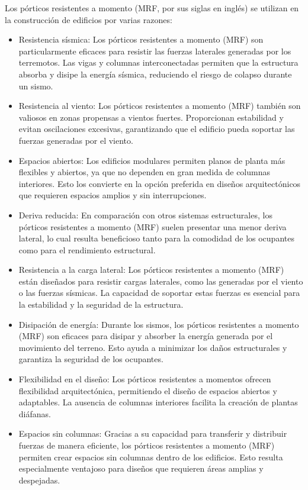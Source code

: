 \documentclass[14pt,letterpaper]{extarticle}
\begin{document}
	Los pórticos resistentes a momento (MRF, por sus siglas en inglés) se utilizan en la construcción de edificios por varias razones:
	\begin{itemize}
		\item Resistencia sísmica: Los pórticos resistentes a momento (MRF) son particularmente eficaces para resistir las fuerzas laterales generadas por los terremotos. Las vigas y columnas interconectadas permiten que la estructura absorba y disipe la energía sísmica, reduciendo el riesgo de colapso durante un sismo.
		\item Resistencia al viento: Los pórticos resistentes a momento (MRF) también son valiosos en zonas propensas a vientos fuertes. Proporcionan estabilidad y evitan oscilaciones excesivas, garantizando que el edificio pueda soportar las fuerzas generadas por el viento.
		\item Espacios abiertos: Los edificios modulares permiten planos de planta más flexibles y abiertos, ya que no dependen en gran medida de columnas interiores. Esto los convierte en la opción preferida en diseños arquitectónicos que requieren espacios amplios y sin interrupciones.
		\item Deriva reducida: En comparación con otros sistemas estructurales, los pórticos resistentes a momento (MRF) suelen presentar una menor deriva lateral, lo cual resulta beneficioso tanto para la comodidad de los ocupantes como para el rendimiento estructural.
		\item Resistencia a la carga lateral: Los pórticos resistentes a momento (MRF) están diseñados para resistir cargas laterales, como las generadas por el viento o las fuerzas sísmicas. La capacidad de soportar estas fuerzas es esencial para la estabilidad y la seguridad de la estructura.
		\item Disipación de energía: Durante los sismos, los pórticos resistentes a momento (MRF) son eficaces para disipar y absorber la energía generada por el movimiento del terreno. Esto ayuda a minimizar los daños estructurales y garantiza la seguridad de los ocupantes.
		\item Flexibilidad en el diseño: Los pórticos resistentes a momentos ofrecen flexibilidad arquitectónica, permitiendo el diseño de espacios abiertos y adaptables. La ausencia de columnas interiores facilita la creación de plantas diáfanas.
		\item Espacios sin columnas: Gracias a su capacidad para transferir y distribuir fuerzas de manera eficiente, los pórticos resistentes a momento (MRF) permiten crear espacios sin columnas dentro de los edificios. Esto resulta especialmente ventajoso para diseños que requieren áreas amplias y despejadas.

\end{itemize}
\end{document}
